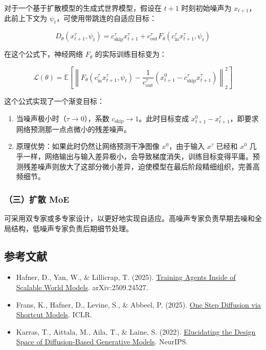 对于一个基于扩散模型的生成式世界模型，假设在 \(t+1\) 时刻初始噪声为 \(x_{t+1}\)，此前上下文为 \(\psi_t\)，可使用带跳连的自适应目标：

\[
D_\theta(x_{t+1}^{\tau},\psi_t)
=c_{\mathrm{skip}}^\tau x_{t+1}^{\tau}
+c_{\mathrm{out}}^\tau F_\theta(c_{\mathrm{in}}^\tau x_{t+1}^{\tau},\psi_t)
\]

在这个公式下，神经网络 \(F_\theta\) 的实际训练目标变为：

\[
\mathcal{L}(\theta)=
\mathbb{E}\left[
\left\|
F_\theta(c_{\mathrm{in}}^\tau x_{t+1}^{\tau},\psi_t) -
\frac{1}{c_{\mathrm{out}}^\tau}
\left(x_{t+1}^{0}-c_{\mathrm{skip}}^\tau x_{t+1}^{\tau}\right)
\right\|_2^2
\right]
\]

这个公式实现了一个渐变目标：

\begin{enumerate}
\def\labelenumi{\arabic{enumi}.}
\tightlist
\item
  当噪声极小时（\(\tau\to 0\)），系数 \(c_{\mathrm{skip}}\to 1\)。此时目标变成 \(x_{t+1}^0-x_{t+1}^{\tau}\)，即要求网络预测那一点点微小的残差噪声。
\item
  原理优势：如果此时仍然让网络预测干净图像 \(x^0\)，由于输入 \(x^\tau\) 已经和 \(x^0\) 几乎一样，网络输出与输入差异极小，会导致梯度消失，训练目标变得平庸。预测残差噪声则放大了这部分微小差异，迫使模型在最后阶段精细组织，完善高频细节。
\end{enumerate}

\hypertarget{ux4e09ux6269ux6563-moe}{%
\subsubsection{（三）扩散 MoE}\label{ux4e09ux6269ux6563-moe}}

可采用双专家或多专家设计，以更好地实现自适应。高噪声专家负责早期去噪和全局结构，低噪声专家负责后期细节处理。

\hypertarget{ux53c2ux8003ux6587ux732e-143}{%
\subsection{参考文献}\label{ux53c2ux8003ux6587ux732e-143}}

\vspace{0.25em}
\begin{itemize}
\tightlist
\item
  Hafner, D., Yan, W., \& Lillicrap, T. (2025). \href{https://arxiv.org/abs/2509.24527}{Training Agents Inside of Scalable World Models}. arXiv:2509.24527.
\item
  Frans, K., Hafner, D., Levine, S., \& Abbeel, P. (2025). \href{https://arxiv.org/abs/2410.12557}{One Step Diffusion via Shortcut Models}. ICLR.
\item
  Karras, T., Aittala, M., Aila, T., \& Laine, S. (2022). \href{https://arxiv.org/abs/2206.00364}{Elucidating the Design Space of Diffusion-Based Generative Models}. NeurIPS.
\end{itemize}

